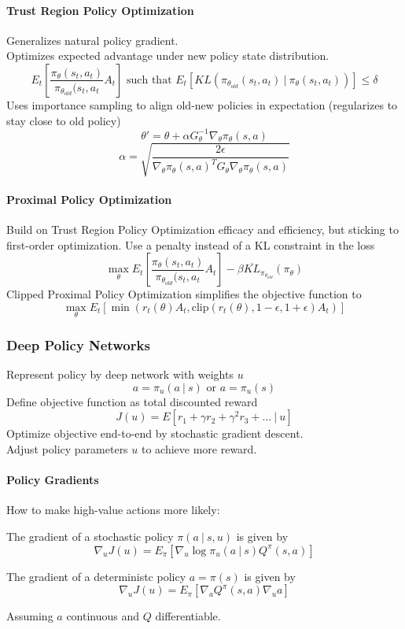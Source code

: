 \documentclass[10pt]{report}
\begin{document}
\paragraph{Trust Region Policy Optimization} Generalizes natural policy gradient.\\
Optimizes expected advantage under new policy state distribution.
$$E_t\left[\frac{\pi_\theta(s_t,a_t)}{\pi_{\theta_{old}}(s_t,a_t}A_t\right]\text{ such that }E_t\left[KL\left(\pi_{\theta_{old}}(s_t,a_t)\:|\:\pi_\theta(s_t,a_t)\right)\right]\leq \delta$$
Uses importance sampling to align old-new policies in expectation (regularizes to stay close to old policy)
$$\theta'=\theta+\alpha G_\theta^{-1}\nabla_\theta\pi_\theta(s,a)$$
$$\alpha=\sqrt{\frac{2\epsilon}{\nabla_\theta\pi_\theta(s,a)^TG_\theta\nabla_\theta\pi_\theta(s,a)}}$$
\paragraph{Proximal Policy Optimization} Build on Trust Region Policy Optimization efficacy and efficiency, but sticking to first-order optimization. Use a penalty instead of a KL constraint in the loss
$$\max_\theta E_t\left[\frac{\pi_\theta(s_t,a_t)}{\pi_{\theta_{old}}(s_t,a_t}A_t\right]-\beta\overline{KL}_{\pi_{\theta_{old}}}(\pi_\theta)$$
Clipped Proximal Policy Optimization simplifies the objective function to
$$\max_\theta E_t[\min(r_t(\theta)A_t, \text{clip}(r_t(\theta),1-\epsilon,1+\epsilon)A_t)]$$
\subsubsection{Deep Policy Networks}
Represent policy by deep network with weights $u$
$$a=\pi_u(a\:|\:s)\text{ or } a=\pi_u(s)$$
Define objective function as total discounted reward
$$J(u) = E[r_1+\gamma r_2+\gamma^2r_3+\ldots\:|\:u]$$
Optimize objective end-to-end by stochastic gradient descent.\\
Adjust policy parameters $u$ to achieve more reward.
\paragraph{Policy Gradients} How to make high-value actions more likely:
\begin{list}{}{}
	\item The gradient of a stochastic policy $\pi(a\:|\:s,u)$ is given by $$\nabla_u J(u) = E_\pi[\nabla_u\log\pi_u(a\:|\:s)Q^\pi(s,a)]$$
	\item The gradient of a deterministc policy $a=\pi(s)$ is given by
	$$\nabla_u J(u) = E_\pi[\nabla_aQ^\pi(s,a)\nabla_u a]$$
\end{list}
Assuming $a$ continuous and $Q$ differentiable.
\end{document}

